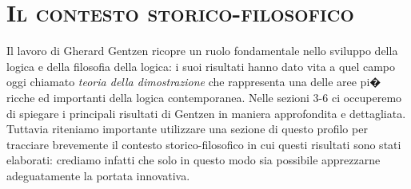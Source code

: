 \documentclass[a4paper,12pt]{aphex}
\begin{document}
\section{\textsc{Il contesto storico-filosofico}}

Il lavoro di Gherard Gentzen ricopre un ruolo fondamentale nello sviluppo della logica e della filosofia della logica: i suoi risultati hanno dato vita a quel campo oggi chiamato  \emph{teoria della dimostrazione} che rappresenta una delle aree pi� ricche ed importanti della logica contemporanea. Nelle sezioni 3-6 ci occuperemo di spiegare i principali risultati di Gentzen in maniera approfondita e dettagliata. Tuttavia riteniamo importante utilizzare una sezione di questo profilo per tracciare brevemente il contesto storico-filosofico in cui questi risultati sono stati elaborati: crediamo infatti che solo in questo modo sia possibile apprezzarne adeguatamente  la portata innovativa. 
\end{document}
